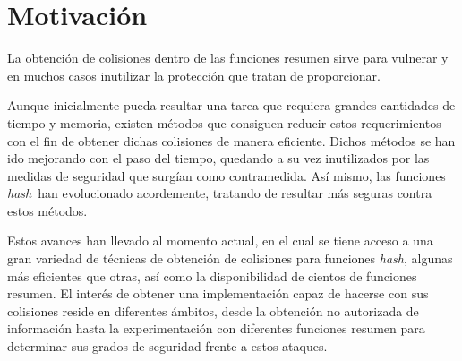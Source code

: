 \documentclass[12pt,spanish,listoffigures,listoftables,listofalgorithms]{tfgetsinf}
\newcommand{\hash}{\textit{hash}}
\begin{document}
\section{Motivaci\'on}

%
%

La obtención de colisiones dentro de las funciones resumen sirve para vulnerar y en muchos casos inutilizar la protección que tratan de proporcionar.

Aunque inicialmente pueda resultar una tarea que requiera grandes cantidades de tiempo y memoria, existen métodos que consiguen reducir estos requerimientos con el fin de obtener dichas colisiones de manera eficiente. Dichos métodos se han ido mejorando con el paso del tiempo, quedando a su vez inutilizados por las medidas de seguridad que surgían como contramedida. Así mismo, las funciones \hash~han evolucionado acordemente, tratando de resultar más seguras contra estos métodos.

Estos avances han llevado al momento actual, en el cual se tiene acceso a una gran variedad de técnicas de obtención de colisiones para funciones \hash, algunas más eficientes que otras, así como la disponibilidad de cientos de funciones resumen. El interés de obtener una implementación capaz de hacerse con sus colisiones reside en diferentes ámbitos, desde la obtención no autorizada de información hasta la experimentación con diferentes funciones resumen para determinar sus grados de seguridad frente a estos ataques.
\end{document}
